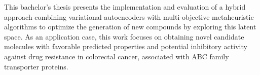 This bachelor's thesis presents the implementation and evaluation of a hybrid approach combining variational autoencoders with multi-objective metaheuristic algorithms to optimize the generation of new compounds by exploring this latent space. As an application case, this work focuses on obtaining novel candidate molecules with favorable predicted properties and potential inhibitory activity against drug resistance in colorectal cancer, associated with ABC family transporter proteins.

